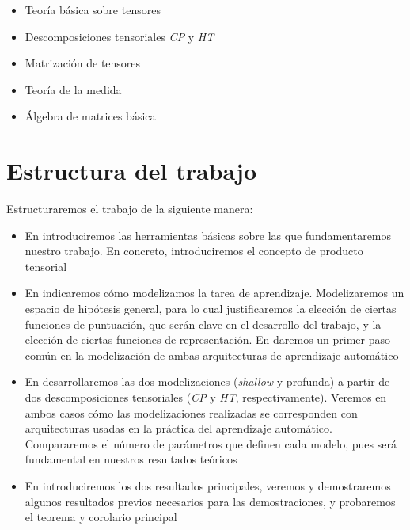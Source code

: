 \begin{itemize}
    \item Teoría básica sobre tensores
    \item Descomposiciones tensoriales \textit{CP} y \textit{HT}
    \item Matrización de tensores
    \item Teoría de la medida
    \item Álgebra de matrices básica
\end{itemize}

\section{Estructura del trabajo}

Estructuraremos el trabajo de la siguiente manera:

\begin{itemize}
    \item En  introduciremos las herramientas básicas sobre las que fundamentaremos nuestro trabajo. En concreto, introduciremos el concepto de producto tensorial
    \item En  indicaremos cómo modelizamos la tarea de aprendizaje. Modelizaremos un espacio de hipótesis general, para lo cual justificaremos la elección de ciertas funciones de puntuación, que serán clave en el desarrollo del trabajo, y la elección de ciertas funciones de representación. En  daremos un primer paso común en la modelización de ambas arquitecturas de aprendizaje automático
    \item En  desarrollaremos las dos modelizaciones (\textit{shallow} y profunda) a partir de dos descomposiciones tensoriales (\textit{CP} y \textit{HT}, respectivamente). Veremos en ambos casos cómo las modelizaciones realizadas se corresponden con arquitecturas usadas en la práctica del aprendizaje automático. Compararemos el número de parámetros que definen cada modelo, pues será fundamental en nuestros resultados teóricos
    \item En  introduciremos los dos resultados principales, veremos y demostraremos algunos resultados previos necesarios para las demostraciones, y probaremos el teorema y corolario principal
\end{itemize}
